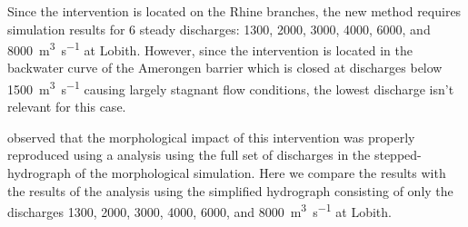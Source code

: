 Since the intervention is located on the Rhine branches, the new \dfmi method requires simulation results for 6 steady discharges: 1300, 2000, 3000, 4000, 6000, and \SI{8000}{\metre\cubed\per\second} at Lobith.
However, since the intervention is located in the backwater curve of the Amerongen barrier which is closed at discharges below \SI{1500}{\metre\cubed\per\second} causing largely stagnant flow conditions, the lowest discharge isn't relevant for this case.

\citet{GiriJagers2022} observed that the morphological impact of this intervention was properly reproduced using a \dfmi analysis using the full set of discharges in the stepped-hydrograph of the morphological simulation.
Here we compare the results with the results of the \dfmi analysis using the simplified hydrograph consisting of only the discharges 1300, 2000, 3000, 4000, 6000, and \SI{8000}{\metre\cubed\per\second} at Lobith.

